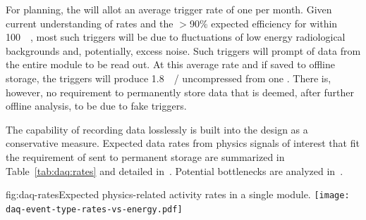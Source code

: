 For planning, the  will allot an average  trigger rate of one per month.
Given current understanding of  rates and the $>$90\% expected efficiency for  within \SI{100}{\kilo\parsec}, most such triggers will be due to fluctuations of low energy radiological backgrounds and, potentially, excess noise.
Such triggers will prompt \snbtime of data from the entire module to be read out.
At this average rate and if saved to offline storage, the 
triggers will produce \SI{1.8}{\peta\byte/\year} uncompressed from one
. There is, however, no requirement to
permanently store 
data that is deemed, after further offline analysis, to be due to fake triggers.

The capability of recording data losslessly is built into the design
as a conservative measure.
Expected data rates from physics signals of interest that fit the
requirement of \offsitepbpy sent to permanent storage are summarized in Table~\ref{tab:daq:rates} and detailed in~. Potential bottlenecks are analyzed in~.

\begin{dunefigure}{fig:daq-rates}{Expected physics-related activity
    rates in a single \nominalmodsize module.
}
  \texttt{[image: daq-event-type-rates-vs-energy.pdf]}
\end{dunefigure}

